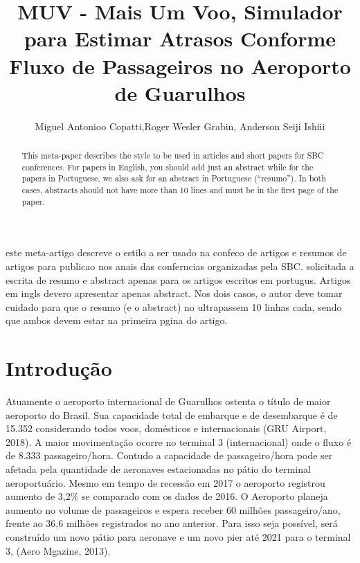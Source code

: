 \documentclass[12pt]{article}
\title{MUV - Mais Um Voo, Simulador para Estimar Atrasos Conforme Fluxo de
  Passageiros no Aeroporto de Guarulhos}
\author{Miguel Antonioo Copatti\inst{1},Roger Wesler Grabin\inst{2}, Anderson Seiji Ishiii\inst{3}}
\begin{document}
 

\maketitle

\begin{abstract}
  This meta-paper describes the style to be used in articles and short papers
  for SBC conferences. For papers in English, you should add just an abstract
  while for the papers in Portuguese, we also ask for an abstract in
  Portuguese (``resumo''). In both cases, abstracts should not have more than
  10 lines and must be in the first page of the paper.
\end{abstract}
     
\begin{resumo} 


  este meta-artigo descreve o estilo a ser usado na confeco de artigos e
  resumos de artigos para publicao nos anais das conferncias organizadas
  pela SBC. solicitada a escrita de resumo e abstract apenas para os artigos
  escritos em portugus. Artigos em ingls devero apresentar apenas abstract.
  Nos dois casos, o autor deve tomar cuidado para que o resumo (e o abstract)
  no ultrapassem 10 linhas cada, sendo que ambos devem estar na primeira
  pgina do artigo.
\end{resumo}


\section{Introdução}

  Atuamente o aeroporto internacional de Guarulhos ostenta o título de maior
  aeroporto do Brasil. Sua capacidade total de embarque e de desembarque é
  de 15.352 considerando todos voos, domésticos e internacionais (GRU Airport, 2018).
  A maior movimentação ocorre no terminal 3 (internacional) onde o fluxo  é de
  8.333 passageiro/hora. Contudo a capacidade de passageiro/hora pode ser 
  afetada pela quantidade de aeronaves estacionadas no pátio do terminal
  aeroportuário. Mesmo em tempo de recessão em 2017 o aeroporto registrou 
  aumento de 3,2\% se comparado com os dados de 2016. O Aeroporto planeja
  aumento no volume de passageiros e espera receber 60 milhões passageiro/ano,
  frente ao 36,6 milhões registrados no ano anterior. Para isso seja possível,
  será construído um novo pátio para aeronave e um novo pier até 2021 para o 
  terminal 3, (Aero Mgazine, 2013).
\end{document}
